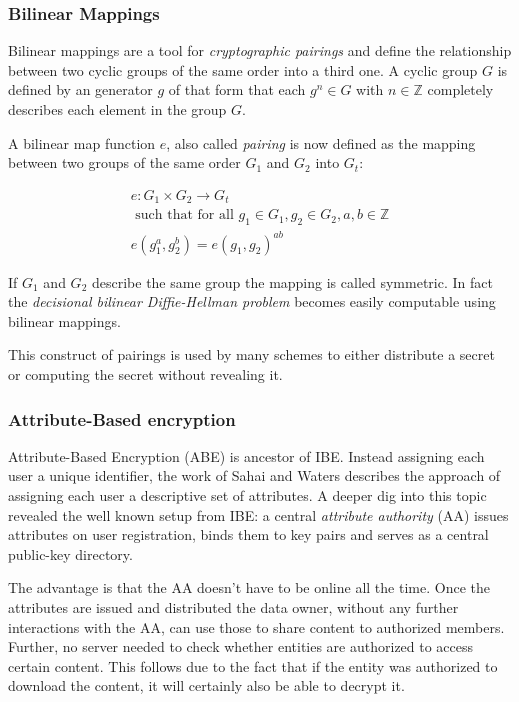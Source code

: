 \subsubsection{Bilinear Mappings}
\label{sec:bilinearmappings}
Bilinear mappings are a tool for \textit{cryptographic pairings} and define the relationship between two cyclic groups of the same order into a third one. A cyclic group $G$ is defined by an generator $g$ of that form that each $g^n \in G$ with $n \in \mathbb{Z}$ completely describes each element in the group $G$.

A bilinear map function $e$, also called \textit{pairing} is now defined as the mapping between two groups of the same order $G_1$ and $G_2$ into $G_t$:

\begin{gather*}
 e : G_1 \times G_2 \rightarrow G_t \\
\text{ such that for all } g_1 \in G_1, g_2 \in G_2, a, b \in \mathbb{Z} \\
e(g_1^a, g_2^b) = e(g_1, g_2)^{ab} 
\end{gather*}

If $G_1$ and $G_2$ describe the same group the mapping is called symmetric. In fact the \textit{decisional bilinear Diffie-Hellman problem} becomes easily computable using bilinear mappings. \cite{bethencourt2015intro}

This construct of pairings is used by many schemes to either distribute a secret or computing the secret without revealing it.

\subsubsection{Attribute-Based encryption}
Attribute-Based Encryption (\ac{ABE}) is ancestor of IBE. Instead assigning each user a unique identifier, the work of Sahai and Waters \cite{sahai2005fuzzy} describes the approach of assigning each user a descriptive set of attributes. A deeper dig into this topic revealed the well known setup from \ac{IBE}: a central \textit{attribute authority} (\ac{AA}) issues attributes on user registration, binds them to key pairs and serves as a central public-key directory. 

The advantage is that the \ac{AA} doesn't have to be online all the time. Once the attributes are issued and distributed the data owner, without any further interactions with the \ac{AA}, can use those to share content to authorized members. Further, no server needed to check whether entities are authorized to access certain content. This follows due to the fact that if the entity was authorized to download the content, it will certainly also be able to decrypt it. 


